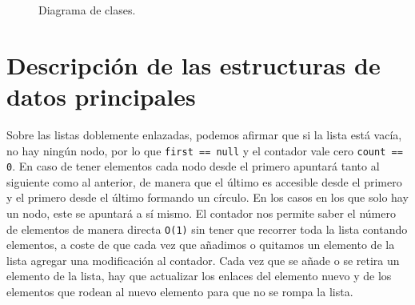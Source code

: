\documentclass[a4paper,11pt]{report}
\begin{document}
\begin{figure}[htbp]
{%
}
\caption{Diagrama de clases.}
\label{fig:diagramaClases}
\end{figure}

\chapter{Descripción de las estructuras de datos principales}

Sobre las listas doblemente enlazadas, podemos afirmar que si la lista está vacía, no hay ningún nodo, por lo que \texttt{first == null} y el contador vale cero \texttt{count == 0}. En caso de tener elementos cada nodo desde el primero apuntará tanto al siguiente como al anterior, de manera que el último es accesible desde el primero y el primero desde el último formando un círculo.
En los casos en los que solo hay un nodo, este se apuntará a sí mismo. El contador nos permite saber el número de elementos de manera directa \texttt{O(1)} sin tener que recorrer toda la lista contando elementos, a coste de que cada vez que añadimos o quitamos un elemento de la lista agregar una modificación al contador.
Cada vez que se añade o se retira un elemento de la lista, hay que actualizar los enlaces del elemento nuevo y de los elementos que rodean al nuevo elemento para que no se rompa la lista.
\end{document}
